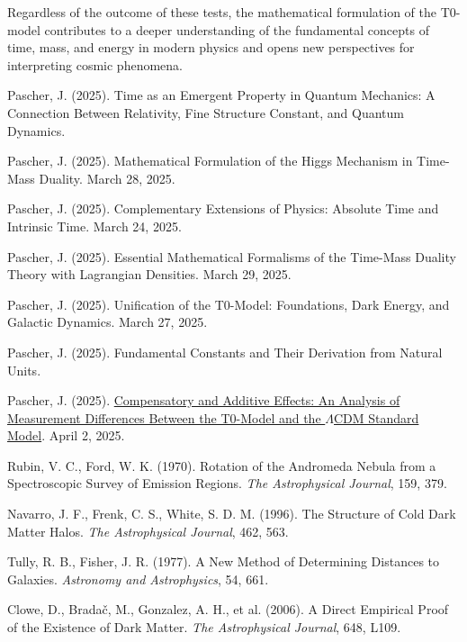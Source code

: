 \documentclass[a4paper,12pt]{article}
\newcommand{\repobase}{https://github.com/jpascher/T0-Time-Mass-Duality/tree/main/2/}
\begin{document}
	Regardless of the outcome of these tests, the mathematical formulation of the T0-model contributes to a deeper understanding of the fundamental concepts of time, mass, and energy in modern physics and opens new perspectives for interpreting cosmic phenomena.
	
	\begin{thebibliography}{99}
		
		 Pascher, J. (2025). Time as an Emergent Property in Quantum Mechanics: A Connection Between Relativity, Fine Structure Constant, and Quantum Dynamics.
		
		 Pascher, J. (2025). Mathematical Formulation of the Higgs Mechanism in Time-Mass Duality. March 28, 2025.
		
		 Pascher, J. (2025). Complementary Extensions of Physics: Absolute Time and Intrinsic Time. March 24, 2025.
		
		 Pascher, J. (2025). Essential Mathematical Formalisms of the Time-Mass Duality Theory with Lagrangian Densities. March 29, 2025.
		
		 Pascher, J. (2025). Unification of the T0-Model: Foundations, Dark Energy, and Galactic Dynamics. March 27, 2025.
		
		 Pascher, J. (2025). Fundamental Constants and Their Derivation from Natural Units.
		
		 Pascher, J. (2025). \href{\repobase/pdf/Deutsch/Analyse der Messdifferenzen zwischen dem T0-Modell und dem Standardmodell.pdf}{Compensatory and Additive Effects: An Analysis of Measurement Differences Between the T0-Model and the $\Lambda$CDM Standard Model}. April 2, 2025.
		
		 Rubin, V. C., Ford, W. K. (1970). Rotation of the Andromeda Nebula from a Spectroscopic Survey of Emission Regions. \textit{The Astrophysical Journal}, 159, 379.
		
		 Navarro, J. F., Frenk, C. S., White, S. D. M. (1996). The Structure of Cold Dark Matter Halos. \textit{The Astrophysical Journal}, 462, 563.
		
		 Tully, R. B., Fisher, J. R. (1977). A New Method of Determining Distances to Galaxies. \textit{Astronomy and Astrophysics}, 54, 661.
		
		 Clowe, D., Bradač, M., Gonzalez, A. H., et al. (2006). A Direct Empirical Proof of the Existence of Dark Matter. \textit{The Astrophysical Journal}, 648, L109.
		

\end{thebibliography}
\end{document}
